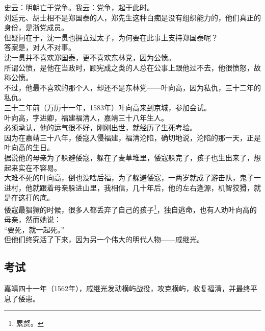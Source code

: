 \begin{multicols}{\theparacolNo}
史云：明朝亡于党争。我云：党争，起于此时。\\

刘廷元、胡士相不是郑国泰的人，郑先生这种白痴是没有组织能力的，他们真正的身份，是浙党成员。\\

但疑问在于，沈一贯也拥立过太子，为何要在此事上支持郑国泰呢？\\

答案是，对人不对事。\\

沈一贯并不喜欢郑国泰，更不喜欢东林党，因为公愤。\\

所谓公愤，是他在当政时，顾宪成之类的人总在公事上跟他过不去，他很愤怒，故称公愤。\\

不过，他最不喜欢的那个人，却还不是东林党——叶向高，因为私仇，三十二年的私仇。\\

三十二年前（万历十一年，1583年）叶向高来到京城，参加会试。\\

叶向高，字进卿，福建福清人，嘉靖三十八年生人。\\

必须承认，他的运气很不好，刚刚出世，就经历了生死考验。\\

因为在嘉靖三十八年，倭寇入侵福建，福清沦陷，确切地说，沦陷的那一天，正是叶向高的生日。\\

据说他的母亲为了躲避倭寇，躲在了麦草堆里，倭寇躲完了，孩子也生出来了，想起来实在不容易。\\

大难不死的叶向高，倒也没啥后福，为了躲避倭寇，一两岁就成了游击队，鬼子一进村，他就跟着母亲躲进山里，我相信，几十年后，他的左右逢源，机智狡猾，就是在这打的底。\\

倭寇最猖獗的时候，很多人都丢弃了自己的孩子\footnote{累赘。}，独自逃命，也有人劝叶向高的母亲，然而她说：\\

“要死，就一起死。”\\

但他们终究活了下来，因为另一个伟大的明代人物——戚继光。\\

\subsection{考试}
嘉靖四十一年（1562年），戚继光发动横屿战役，攻克横屿，收复福清，并最终平息了倭患。\\


\end{multicols}
